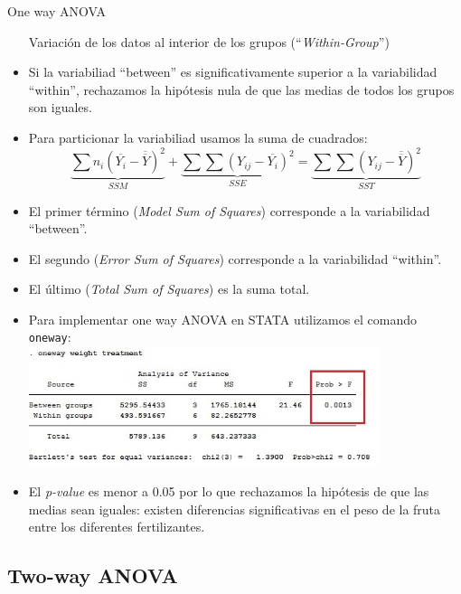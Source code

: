 \documentclass{beamer}
\begin{document}
\begin{frame}[allowframebreaks]{One way ANOVA}
\begin{itemize}
\begin{center}
Variación de los datos al interior de los grupos (``\textit{Within-Group}'')
\end{center}
\item Si la variabiliad ``between'' es significativamente superior a la variabilidad ``within'', rechazamos la hipótesis nula de que las medias de todos los grupos son iguales.
\item Para particionar la variabiliad usamos la suma de cuadrados: \\
\begin{displaymath}
\underbrace{\sum n_{i}(\overline{Y_{i}}-\overline{\overline{Y}})^2}_{SSM} + \underbrace{\sum \sum (Y_{ij}-\overline{Y_{i}})^2}_{SSE} = \underbrace{\sum \sum (Y_{ij}-\overline{\overline{Y}})^2}_{SST}
\end{displaymath}
\item El primer término (\textit{Model Sum of Squares}) corresponde a la variabilidad ``between''.
\item El segundo (\textit{Error Sum of Squares}) corresponde a la variabilidad ``within''.
\item El último (\textit{Total Sum of Squares}) es la suma total.
\item Para implementar one way ANOVA en STATA utilizamos el comando \texttt{oneway}:\\
\includegraphics[height=3.5cm]{oneway2.jpg}
\item El \textit{p-value} es menor a 0.05 por lo que rechazamos la hipótesis de que las medias sean iguales: existen diferencias significativas en el peso de la fruta entre los diferentes fertilizantes.
\end{itemize}
\end{frame}

\subsection{Two-way ANOVA}
\end{document}
